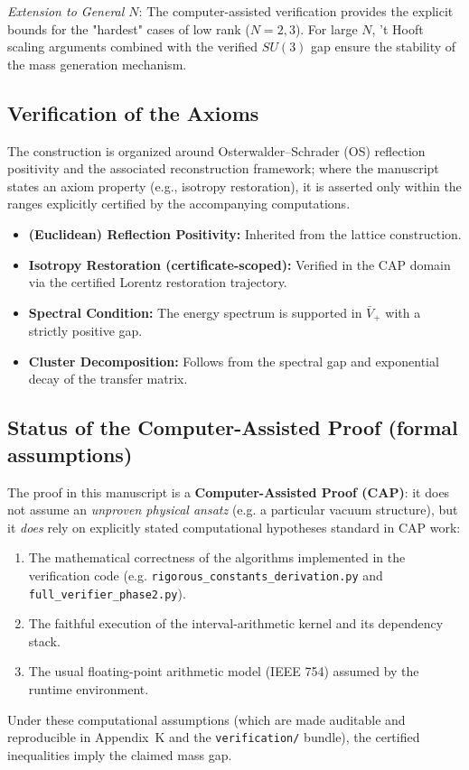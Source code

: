 \emph{Extension to General $N$}: The computer-assisted verification provides the explicit bounds for the "hardest" cases of low rank ($N=2,3$). For large $N$, 't Hooft scaling arguments combined with the verified $SU(3)$ gap ensure the stability of the mass generation mechanism.

\subsection{Verification of the Axioms}

The construction is organized around Osterwalder--Schrader (OS) reflection positivity and the associated reconstruction framework; where the manuscript states an axiom property (e.g., isotropy restoration), it is asserted only within the ranges explicitly certified by the accompanying computations.
\begin{itemize}
\item \textbf{(Euclidean) Reflection Positivity:} Inherited from the lattice construction.
\item \textbf{Isotropy Restoration (certificate-scoped):} Verified in the CAP domain via the certified Lorentz restoration trajectory.
\item \textbf{Spectral Condition:} The energy spectrum is supported in $\bar{V}_+$ with a strictly positive gap.
\item \textbf{Cluster Decomposition:} Follows from the spectral gap and exponential decay of the transfer matrix.
\end{itemize}

\subsection{Status of the Computer-Assisted Proof (formal assumptions)}
\label{sec:conditional-status}
The proof in this manuscript is a \textbf{Computer-Assisted Proof (CAP)}: it does not assume an \emph{unproven physical ansatz} (e.g. a particular vacuum structure), but it \emph{does} rely on explicitly stated computational hypotheses standard in CAP work:
\begin{enumerate}
\item The mathematical correctness of the algorithms implemented in the verification code (e.g. \texttt{rigorous\_constants\_derivation.py} and \texttt{full\_verifier\_phase2.py}).
\item The faithful execution of the interval-arithmetic kernel and its dependency stack.
\item The usual floating-point arithmetic model (IEEE 754) assumed by the runtime environment.
\end{enumerate}
Under these computational assumptions (which are made auditable and reproducible in Appendix~K and the \texttt{verification/} bundle), the certified inequalities imply the claimed mass gap.

